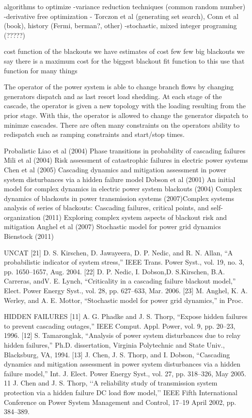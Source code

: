 algorithms to optimize
-variance reduction techniques (common random number)
-derivative free optimization - Torczon et al (generating set search), Conn et al (book), history (Fermi, berman?, other)
-stochastic, mixed integer programing (?????)



cost function of the blackouts
we have estimates of cost few few big blackouts
we say there is a maximum cost for the biggest blackout
fit function to this
use that function for many things



The operator of the power system is able to change branch flows by changing generators dispatch and as last resort load shedding.  At each stage of the cascade, the operator is given a new topology with the loading resulting from the prior stage.  With this, the operator is allowed to change the generator dispatch to minimze cascades.  There are often many constraints on the operators ability to redispatch such as ramping constraints and start/stop times.	

Probalistic
Liao et al (2004) Phase transitions in probability of cascading failures
Mili et al (2004) Risk assessment of catastrophic failures in electric power systems
Chen et al (2005) Cascading dynamics and mitigation assessment in power system disturbances via a hidden failure model
Dobson et al 
(2001)  An initial model for complex dynamics in electric power system blackouts
(2004) Complex dynamics of blackouts in power transmission systems
(2007)Complex systems analysis of series of blackouts: Cascading failures, critical points, and self-organization
 (2011) Exploring complex system aspects of blackout risk and mitigation
Anghel et al (2007) Stochastic model for power grid dynamics
Bienstock (2011)

UNCAT
[21] D. S. Kirschen, D. Jawayeera, D. P. Nedic, and R. N. Allan, “A probabilistic
indicator of system stress,” IEEE Trans. Power Syst., vol. 19,
no. 3, pp. 1650–1657, Aug. 2004.
[22] D. P. Nedic, I. Dobson,D. S.Kirschen, B.A. Carreras, andV. E. Lynch,
“Criticality in a cascading failure blackout model,” Elect. Power Energy
Syst., vol. 28, pp. 627–633, Mar. 2006.
[23] M. Anghel, K. A. Werley, and A. E. Mottor, “Stochastic model for
power grid dynamics,” in Proc.


HIDDEN FAILURES
[11] A. G. Phadke and J. S. Thorp, “Expose hidden failures to prevent cascading
outages,” IEEE Comput. Appl. Power, vol. 9, pp. 20–23, 1996.
[12] S. Tamaronglak, “Analysis of power system disturbances due to relay
hidden failures,” Ph.D. dissertation, Virginia Polytechnic and State
Univ., Blacksburg, VA, 1994.
[13] J. Chen, J. S. Thorp, and I. Dobson, “Cascading dynamics and mitigation
assessment in power system disturbances via a hidden failure
model,” Int. J. Elect. Power Energy Syst., vol. 27, pp. 318–326, May
2005.
11 J. Chen and J. S. Thorp, ‘‘A reliability study of transmission system protection
via a hidden failure DC load flow model,’’ IEEE Fifth International
Conference on Power System Management and Control, 17–19 April
2002, pp. 384–389.


